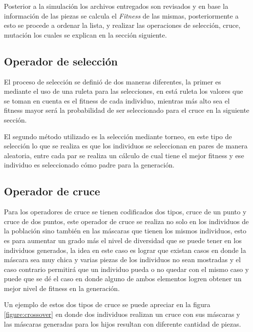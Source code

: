 Posterior a la simulación los archivos entregados son revisados y en base la
información de las piezas se calcula el \textit{Fitness} de las mismas,
posteriormente a esto se procede a ordenar la lista, y realizar las operaciones
de selección, cruce, mutación los cuales se explican en la sección siguiente.

\subsection{Operador de selección}
\label{subsection:sel_operator}

El proceso de selección se definió de dos maneras diferentes, la primer es
mediante el uso de una ruleta para las selecciones, en está ruleta los valores que
se toman en cuenta es el fitness de cada individuo, mientras más alto sea el
fitness mayor será la probabilidad de ser seleccionado para el cruce en la
siguiente sección.

El segundo método utilizado es la selección mediante torneo, en este tipo de
selección lo que se realiza es que los individuos se seleccionan en pares de
manera aleatoria, entre cada par se realiza un cálculo de cual tiene el mejor
fitness y ese individuo es seleccionado cómo padre para la generación.

\subsection{Operador de cruce}
\label{subsection:crossover_operator}

Para los operadores de cruce se tienen codificados dos tipos, cruce de un punto
y cruce de dos puntos, este operador de cruce se realiza no solo en los
individuos de la población sino también en las máscaras que tienen los mismos
individuos, esto es para aumentar un grado más el nivel de diversidad que se
puede tener en los individuos generados, la idea en este caso es lograr que
existan casos en donde la máscara sea muy chica y varias piezas de los
individuos no sean mostradas y el caso contrario permitirá que un individuo
pueda o no quedar con el mismo caso y puede que se dé el caso en donde alguno de
ambos elementos logren obtener un mejor nivel de fitness en la generación.

Un ejemplo de estos dos tipos de cruce se puede apreciar en la figura
\ref{figure:crossover} en donde dos individuos realizan un cruce con sus
máscaras y las máscaras generadas para los hijos resultan con diferente cantidad
de piezas.

